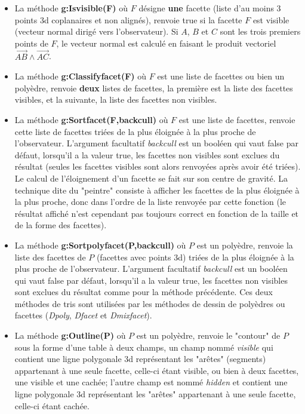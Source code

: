 \begin{itemize}
    \item La méthode \textbf{g:Isvisible(F)} où $F$ désigne \textbf{une} facette (liste d'au moins 3 points 3d coplanaires et non alignés), renvoie true si la facette $F$ est visible (vecteur normal dirigé vers l'observateur). Si $A$, $B$ et $C$ sont les trois premiers points de $F$, le vecteur normal est calculé en faisant le produit vectoriel $\vec{AB}\wedge\vec{AC}$.
    
    \item La méthode \textbf{g:Classifyfacet(F)} où $F$ est une liste de facettes ou bien un polyèdre, renvoie \textbf{deux} listes de facettes, la première est la liste des facettes visibles, et la suivante, la liste des facettes non visibles.
    
    \item La méthode \textbf{g:Sortfacet(F,backcull)} où $F$ est une liste de facettes, renvoie cette liste de facettes triées de la plus éloignée à la plus proche de l'observateur. L'argument facultatif \emph{backcull} est un booléen qui vaut false par défaut, lorsqu'il a la valeur true, les facettes non visibles sont exclues du résultat (seules les facettes visibles sont alors renvoyées après avoir été triées). Le calcul de l'éloignement d'un facette se fait sur son centre de gravité. La technique dite du "peintre" consiste à afficher les facettes de la plus éloignée à la plus proche, donc dans l'ordre de la liste renvoyée par cette fonction (le résultat affiché n'est cependant pas toujours correct en fonction de la taille et de la forme des facettes).
    
    \item La méthode \textbf{g:Sortpolyfacet(P,backcull)} où $P$ est un polyèdre, renvoie la liste des facettes de $P$ (facettes avec points 3d) triées de la plus éloignée à la plus proche de l'observateur. L'argument facultatif \emph{backcull} est un booléen qui vaut false par défaut, lorsqu'il a la valeur true, les facettes non visibles sont exclues du résultat comme pour la méthode précédente. Ces deux méthodes de tris sont utilisées par les méthodes de dessin de polyèdres ou facettes (\emph{Dpoly}, \emph{Dfacet} et \emph{Dmixfacet}).
    
    \item La méthode \textbf{g:Outline(P)} où $P$ est un polyèdre, renvoie le "contour" de $P$ sous la forme d'une table à deux champs, un champ nommé \emph{visible} qui contient une ligne polygonale 3d représentant les "arêtes" (segments) appartenant à une seule facette, celle-ci étant visible, ou bien à deux facettes, une visible et une cachée; l'autre champ est nommé \emph{hidden} et contient une ligne polygonale 3d représentant les "arêtes" appartenant à une seule facette, celle-ci étant cachée.
    

\end{itemize}
